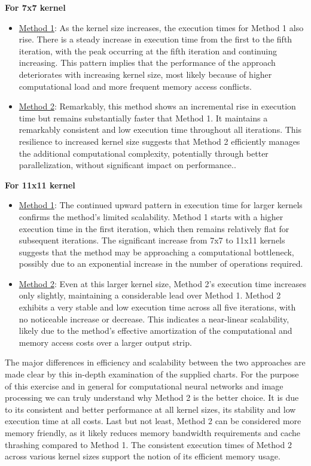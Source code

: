 \textbf{For 7x7 kernel}	
\begin{itemize}
		\item \underline{Method 1}: As the kernel size increases, the execution times for Method 1 also rise. There is a steady increase in execution time from the first to the fifth iteration, with the peak occurring at the fifth iteration and continuing increasing.  This pattern implies that the performance of the approach deteriorates with increasing kernel size, most likely because of higher computational load and more frequent memory access conflicts.
		\item \underline{Method 2}: Remarkably, this method shows an incremental rise in execution time but remains substantially faster that Method 1. It maintains a remarkably consistent and low execution time throughout all iterations. This resilience to increased kernel size suggests that Method 2 efficiently manages the additional computational complexity, potentially through better parallelization, without significant impact on performance..
\end{itemize}

\textbf{For 11x11 kernel}
\begin{itemize}
	\item \underline{Method 1}: The continued upward pattern in execution time for larger kernels confirms the method's limited scalability. Method 1 starts with a higher execution time in the first iteration, which then remains relatively flat for subsequent iterations. The significant increase from 7x7 to 11x11 kernels suggests that the method may be approaching a computational bottleneck, possibly due to an exponential increase in the number of operations required.
	\item \underline{Method 2}: Even at this larger kernel size, Method 2's execution time increases only slightly, maintaining a considerable lead over Method 1. Method 2 exhibits a very stable and low execution time across all five iterations, with no noticeable increase or decrease. This indicates a near-linear scalability, likely due to the method's effective amortization of the computational and memory access costs over a larger output strip.
\end{itemize}		

The major differences in efficiency and scalability between the two approaches are made clear by this in-depth examination of the supplied charts. For the purpose of this exercise and in general for computational neural networks and image processing we can truly understand why Method 2 is the better choice. It is due to its consistent and better performance at all kernel sizes, its stability and low execution time at all costs. Last but not least, Method 2 can be considered more memory friendly, as it likely reduces memory bandwidth requirements and cache thrashing compared to Method 1. The consistent execution times of Method 2 across various kernel sizes support the notion of its efficient memory usage.
	








